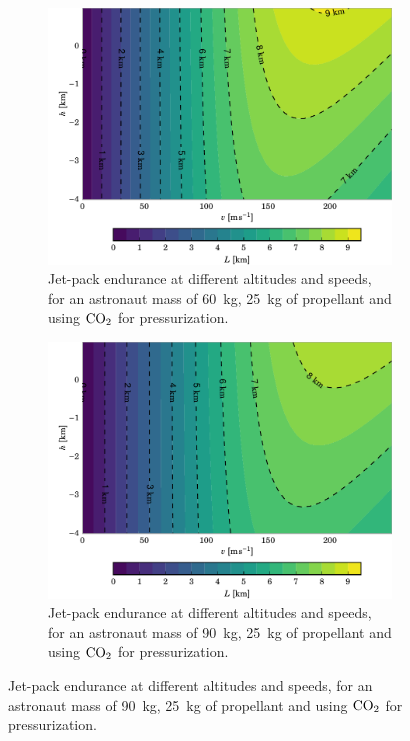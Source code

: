 \documentclass[twocolumn]{article}
\newcommand{\COtwo}{\textnormal{CO}_2}
\begin{document}
\begin{figure}[h!]
  \centering
  \begin{subfigure}{\textwidth}
    \includegraphics{img/l_ma_60_mp_25}
  \caption{Jet-pack endurance at different altitudes and speeds, for an 
astronaut mass of \SI{60}{\kilogram}, \SI{25}{\kilogram} of propellant
and using $\COtwo$ for pressurization.}
    \label{fig:l_ma_60_mp_25}
  \end{subfigure}
  \begin{subfigure}{\textwidth}
    \includegraphics{img/l_ma_90_mp_25}
  \caption{Jet-pack endurance at different altitudes and speeds, for an 
astronaut mass of \SI{90}{\kilogram}, \SI{25}{\kilogram} of propellant
and using $\COtwo$ for pressurization.}
    \label{fig:l_ma_90_mp_25}
  \end{subfigure}
\end{figure}
\end{document}
